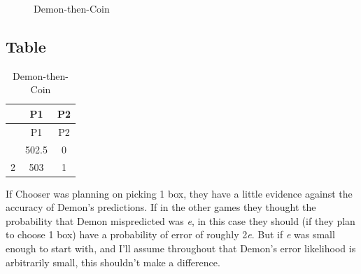 \documentclass[
  10pt,
  letterpaper,
  DIV=11,
  numbers=noendperiod,
  twoside]{scrartcl}
\begin{document}
\begin{figure}


\caption{\label{fig-demon-then-coin}Demon-then-Coin}

\end{figure}%

\subsection{Table}

\begin{longtable}[]{@{}ccc@{}}
\caption{Demon-then-Coin}\label{tbl-demon-then-coin}\tabularnewline
\toprule\noalign{}
& P1 & P2 \\
\midrule\noalign{}
\endfirsthead
\toprule\noalign{}
& P1 & P2 \\
\midrule\noalign{}
\endhead
\bottomrule\noalign{}
\endlastfoot
1 & 502.5 & 0 \\
2 & 503 & 1 \\
\end{longtable}

If Chooser was planning on picking 1 box, they have a little evidence
against the accuracy of Demon's predictions. If in the other games they
thought the probability that Demon mispredicted was \emph{e}, in this
case they should (if they plan to choose 1 box) have a probability of
error of roughly 2\emph{e}. But if \emph{e} was small enough to start
with, and I'll assume throughout that Demon's error likelihood is
arbitrarily small, this shouldn't make a difference.
\end{document}
